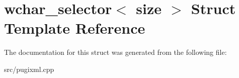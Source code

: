 \hypertarget{structwchar__selector}{}\section{wchar\+\_\+selector$<$ size $>$ Struct Template Reference}
\label{structwchar__selector}


The documentation for this struct was generated from the following file\+:\begin{DoxyCompactItemize}
\item 
src/pugixml.\+cpp\end{DoxyCompactItemize}
